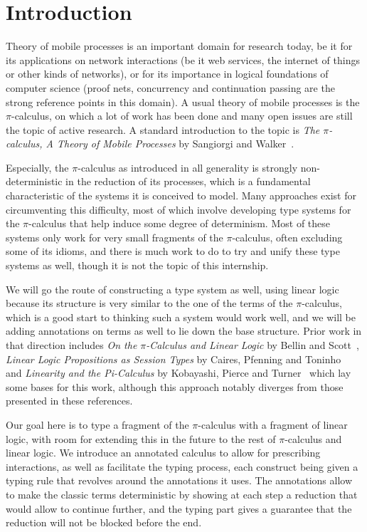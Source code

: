 
\section*{Introduction}

Theory of mobile processes is an important domain for research today, be it for its applications on network interactions (be it web services, the internet of things or other kinds of networks), or for its importance in logical foundations of computer science (proof nets, concurrency and continuation passing are the strong reference points in this domain). A usual theory of mobile processes is the $\pi$-calculus, on which a lot of work has been done and many open issues are still the topic of active research. A standard introduction to the topic is \emph{The $\pi$-calculus, A Theory of Mobile Processes} by Sangiorgi and Walker~\cite{sangiorgi-2001-pi-calculus}.

Especially, the $\pi$-calculus as introduced in all generality is strongly non-deterministic in the reduction of its processes, which is a fundamental characteristic of the systems it is conceived to model. Many approaches exist for circumventing this difficulty, most of which involve developing type systems for the $\pi$-calculus that help induce some degree of determinism. Most of these systems only work for very small fragments of the $\pi$-calculus, often excluding some of its idioms, and there is much work to do to try and unify these type systems as well, though it is not the topic of this internship.

We will go the route of constructing a type system as well, using linear logic because its structure is very similar to the one of the terms of the $\pi$-calculus, which is a good start to thinking such a system would work well, and we will be adding annotations on terms as well to lie down the base structure. Prior work in that direction includes \emph{On the $\pi$-Calculus and Linear Logic} by Bellin and Scott~\cite{bellin-1994-calculus}, \emph{Linear Logic Propositions as Session Types} by Caires, Pfenning and Toninho~\cite{caires-2016-linear} and \emph{Linearity and the Pi-Calculus} by Kobayashi, Pierce and Turner~\cite{kobayashi-1999-linearity} which lay some bases for this work, although this approach notably diverges from those presented in these references.

Our goal here is to type a fragment of the $\pi$-calculus with a fragment of linear logic, with room for extending this in the future to the rest of $\pi$-calculus and linear logic. We introduce an annotated calculus to allow for prescribing interactions, as well as facilitate the typing process, each construct being given a typing rule that revolves around the annotations it uses. The annotations allow to make the classic terms deterministic by showing at each step a reduction that would allow to continue further, and the typing part gives a guarantee that the reduction will not be blocked before the end.

